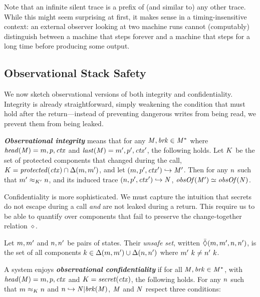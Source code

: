 \documentclass[acmsmall,review,anonymous]{acmart}\settopmatter{printfolios=true,printccs=false,printacmref=false}
\begin{document}
{{Note that an infinite silent trace is a
prefix of (and similar to) any other trace. While this might seem
surprising at first, it makes sense in a timing-insensitive context:
an external observer looking at two machine runs cannot (computably)
distinguish between a machine that steps forever and a machine that
steps for a long time before producing some output.

\subsection{Observational Stack Safety}

We now sketch observational versions of both integrity and confidentiality.
Integrity is already straightforward, simply weakening the condition that must hold
after the return---instead of preventing dangerous writes from being read, we
prevent them from being leaked.

\textbf{\em Observational integrity} means that for any \(\mathit{M},\mathit{brk} \in \mathit{M}^*\)
where \(\mathit{head}(\mathit{M}) = m,p,\mathit{ctx}\) and \(\mathit{last}(\mathit{M}) = m',p',\mathit{ctx}'\),
the following holds. Let \(K\) be the set of protected components that changed during
the call, \(K = \mathit{protected}(\mathit{ctx}) \cap \Delta(m, m')\),
and let \((m,p',\mathit{ctx}') \hookrightarrow \mathit{M}'\).
Then for any \(n\) such that
\(m' \approx_{K'} n\), and its induced trace
\((n,p',\mathit{ctx}') \hookrightarrow \mathit{N}\), \(\mathit{obsOf}(\mathit{M}') \simeq \mathit{obsOf}(\mathit{N})\).

\medskip

Confidentiality is more sophisticated. We must capture the intuition that
secrets do not escape during a call {\em and} are not leaked during a return.
This require us to be able to quantify over components that fail to preserve
the change-together relation \(\diamond\).

 Let \(m,m'\) and \(n,n'\)
be pairs of states. Their {\em unsafe set}, written
\(\bar{\Diamond}(m,m',n,n')\), is the set of all components
\(k \in \Delta(m,m') \cup \Delta(n,n')\) where
\(m' ~ k \not = n' ~ k\).

A system enjoys \textbf{\em observational confidentiality} if for all
\(\mathit{M},\mathit{brk} \in \mathit{M}^*\), with \(\mathit{head}(\mathit{M}) = m,p,\mathit{ctx}\) and
\(K = \mathit{secret}(\mathit{ctx})\), the following holds.
%
For any \(n\) such that \(m \approx_K n\) and
\(n \hookrightarrow \mathit{N} | \mathit{brk}(\mathit{M})\),
\(\mathit{M}\) and \(\mathit{N}\) respect three conditions:

}}
\end{document}
